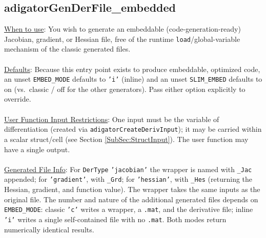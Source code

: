 \documentclass[10pt,pdftex]{article}
\begin{document}
\subsection{adigatorGenDerFile\_embedded}\label{SubSec:GenDerEmbedded}
\underline{When to use}: You wish to generate an embeddable (code-generation-ready) Jacobian, gradient, or Hessian file, free of the runtime \texttt{load}/global-variable mechanism of the classic generated files.\\\\
\underline{Defaults}: Because this entry point exists to produce embeddable, optimized code, an unset \texttt{EMBED\_MODE} defaults to \texttt{'i'} (inline) and an unset \texttt{SLIM\_EMBED} defaults to on (vs.~classic / off for the other generators). Pass either option explicitly to override.\\\\
\underline{User Function Input Restrictions}: One input must be the variable of differentiation (created via \texttt{adigatorCreateDerivInput}); it may be carried within a scalar struct/cell (see Section \ref{SubSec:StructInput}). The user function may have a single output.\\\\
\underline{Generated File Info}: For \texttt{DerType} \texttt{'jacobian'} the wrapper is named with \texttt{\_Jac} appended; for \texttt{'gradient'}, with \texttt{\_Grd}; for \texttt{'hessian'}, with \texttt{\_Hes} (returning the Hessian, gradient, and function value). The wrapper takes the same inputs as the original file. The number and nature of the additional generated files depends on \texttt{EMBED\_MODE}: classic \texttt{'c'} writes a wrapper, a \texttt{.mat}, and the derivative file; inline \texttt{'i'} writes a single self-contained file with no \texttt{.mat}. Both modes return numerically identical results.\\\\
\end{document}
